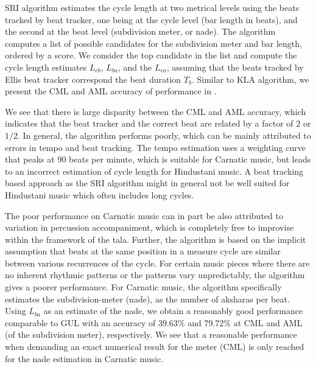 \acrshort{SRI} algorithm estimates the cycle length at two metrical levels using the beats tracked by  beat tracker, one being at the cycle level (bar length in beats), and the second at the beat level (subdivision meter, or \gls{nade}). The algorithm computes a list of possible candidates for the subdivision meter and bar length, ordered by a score. We consider the top candidate in the list and compute the cycle length estimates $L_{cb}$, $L_{ba}$, and the $L_{ca}$, assuming that the beats tracked by Ellis beat tracker correspond the beat duration $T_b$. Similar to \acrshort{KLA} algorithm, we present the \gls{CML} and \gls{AML} accuracy of performance in . 

We see that there is large disparity between the \gls{CML} and \gls{AML} accuracy, which indicates that the beat tracker and the correct beat are related by a factor of $2$ or $1/2$. In general, the algorithm performs poorly, which can be mainly attributed to errors in tempo and beat tracking. The tempo estimation uses a weighting curve that peaks at 90 beats per minute, which is suitable for Carnatic music, but leads to an incorrect estimation of cycle length for Hindustani music. A beat tracking based approach as the \acrshort{SRI} algorithm might in general not be well suited for Hindustani music which often includes long cycles. %

The poor performance on Carnatic music can in part be also attributed to variation in percussion accompaniment, which is completely free to improvise within the framework of the \gls{tala}. Further, the algorithm is based on the implicit assumption that beats at the same position in a measure cycle are similar between various recurrences of the cycle. For certain music pieces where there are no inherent rhythmic patterns or the patterns vary unpredictably, the algorithm gives a poorer performance. For Carnatic music, the algorithm specifically estimates the subdivision-meter (\gls{nade}), as the number of \glspl{akshara} per beat. Using $L_{ba}$ as an estimate of the \gls{nade}, we obtain a reasonably good performance comparable to \acrshort{GUL} with an accuracy of 39.63\% and 79.72\% at \gls{CML} and \gls{AML} (of the subdivision meter), respectively. We see that a reasonable performance when demanding an exact numerical result for the meter (\gls{CML}) is only reached for the \gls{nade} estimation in Carnatic music.

